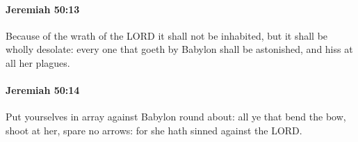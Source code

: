 		\paragraph{Jeremiah 50:13} %
			\label{JEREMIAH-50-13}

			Because of the wrath of the LORD it shall not be inhabited, but it shall be wholly desolate: every one that goeth by Babylon shall be astonished, and hiss at all her plagues.


		\paragraph{Jeremiah 50:14} %
			\label{JEREMIAH-50-14}

			Put yourselves in array against Babylon round about: all ye that bend the bow, shoot at her, spare no arrows: for she hath sinned against the LORD.


